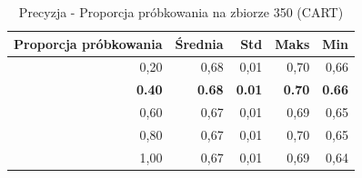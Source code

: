 \begin{table}[htbp]
\centering
\small
\setlength{\tabcolsep}{6pt}
\renewcommand{\arraystretch}{1.2}
\caption{Precyzja - Proporcja próbkowania na zbiorze 350 (CART)}
\label{tab:CART_sample_ratio_350_precision}
\begin{tabular}{r|r|r|r|r}
\toprule
Proporcja próbkowania & Średnia & Std & Maks & Min \\
\hline
0,20 & 0,68 & 0,01 & 0,70 & 0,66 \\
\textbf{0.40} & \textbf{0.68} & \textbf{0.01} & \textbf{0.70} & \textbf{0.66} \\
0,60 & 0,67 & 0,01 & 0,69 & 0,65 \\
0,80 & 0,67 & 0,01 & 0,70 & 0,65 \\
1,00 & 0,67 & 0,01 & 0,69 & 0,64 \\
\bottomrule
\end{tabular}
\end{table}